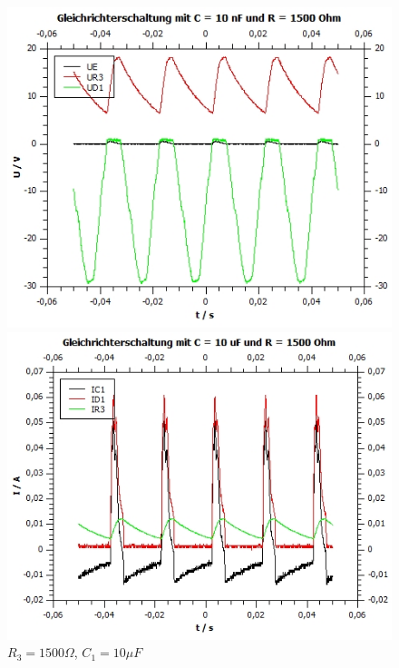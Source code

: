\documentclass[12pt,a4paper,twoside]{article}
\begin{document}
\begin{figure}[H]
    \begin{minipage}[b]{.5\linewidth} %
        \includegraphics[width=1\linewidth]{nudes/Aufgabe 3 plots/1500 ohm 10 uf U.jpg}
        \caption{$R_3 = 1500 \Omega$, $C_1 = 10 \mu F$}
    \end{minipage}
    \hspace{0.01\linewidth}%
    \begin{minipage}[b]{.5\linewidth} %
        \includegraphics[width=1\linewidth]{nudes/Aufgabe 3 plots/1500 ohm 10 uf I.jpg}
    \caption{$R_3 = 1500 \Omega$, $C_1 = 10 \mu F$}
    \end{minipage}
\end{figure}
\end{document}
